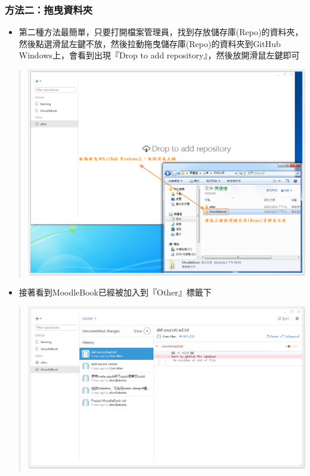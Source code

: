 \documentclass[letterpaper,10pt,english]{sphinxmanual}
\begin{document}
\subsubsection{方法二：拖曳資料夾}
\label{_doc/writing/index-github:id11}\begin{itemize}
\item {} 
第二種方法最簡單，只要打開檔案管理員，找到存放儲存庫(Repo)的資料夾，然後點選滑鼠左鍵不放，然後拉動拖曳儲存庫(Repo)的資料夾到GitHub Windows上，會看到出現『Drop to add repository』，然後放開滑鼠左鍵即可

\end{itemize}
\begin{quote}

\includegraphics{GitHub-DropToAdd-001.png}
\end{quote}
\begin{itemize}
\item {} 
接著看到MoodleBook已經被加入到『Other』標籤下

\end{itemize}
\begin{quote}

\includegraphics{GitHub-DropToAdd-002.png}
\end{quote}
\end{document}
